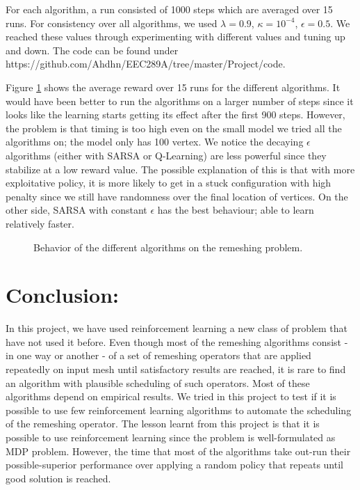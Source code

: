 \documentclass[a4paper,10pt]{article}
\def\url#1{\expandafter\string\csname #1\endcsname}
\begin{document}
For each algorithm, a run consisted of 1000 steps which are averaged over 15 runs. For consistency over all algorithms, we used $\lambda=0.9$, $\kappa=10^{-4}$, $\epsilon=0.5$. We reached these values through experimenting with different values and tuning up and down. The code can be found under \\
\url{https://github.com/Ahdhn/EEC289A/tree/master/Project/code}. 

Figure \ref{fig:rl} shows the average reward over 15 runs for the different algorithms. It would have been better to run the algorithms on a larger number of steps since it looks like the learning starts getting its effect after the first 900 steps. However, the problem is that timing is too high even on the small model we tried all the algorithms on; the model only has 100 vertex. We notice the decaying $\epsilon$ algorithms (either with SARSA or Q-Learning) are less powerful since they stabilize at a low reward value. The possible explanation of this is that with more exploitative policy, it is more likely to get in a stuck configuration with high penalty since we still have randomness over the final location of vertices. On the other side, SARSA with constant $\epsilon$ has the best behaviour; able to learn relatively faster. 

\begin{figure}[htb]
	\centering
	\caption{Behavior of the different algorithms on the remeshing problem. }
	\label{fig:rl}
\end{figure}

\section{Conclusion:}
In this project, we have used reinforcement  learning a new class of problem that have not used it before. Even though most of the remeshing algorithms consist - in one way or another - of a set of remeshing operators that are applied repeatedly on input mesh until satisfactory results are reached, it is rare to find an algorithm with plausible scheduling of such operators. Most of these algorithms depend on empirical results. We tried in this project to test if it is possible to use few reinforcement  learning algorithms to automate the scheduling of the remeshing operator. The lesson learnt from this project is that it is possible to use reinforcement learning since the problem is well-formulated as MDP problem. However, the time that most of the algorithms take out-run their possible-superior performance over applying a random policy that repeats until good solution is reached. 
 
\medskip


\end{document}
